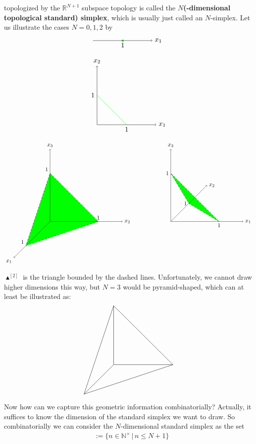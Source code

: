 topologized by the $\mathbb{R}^{N+1}$ subspace topology is called the \textbf{$N$(-dimensional topological standard) simplex}, which is usually just called an $N$-simplex.
Let us illustrate the cases $N = 0,1,2$ by
\[
\begin{tikzpicture}[scale=0.75]
  \fill[fill=green]
    (2,0) node[below] {$1$}
    circle
    (2pt);
  \draw[->]
    (0,0)
    --
    (4,0) node[right] {$x_{1}$};
\end{tikzpicture}
\]
\[
\begin{tikzpicture}[scale=0.75]
  \fill
    (2,0) node[below] {$1$}
    --
    (0,2) node[left] {$1$};
  \draw[green]
    (2,0)
    --
    (0,2);
  \draw[->]
    (0,0)
    --
    (4,0) node[right] {$x_{1}$};
  \draw[->]
    (0,0)
    --
    (0,4) node[above] {$x_{2}$};
\end{tikzpicture}
\]
\[
\begin{tikzpicture}[scale=0.75]
  \filldraw[dashed,fill=green]
    (-7,-2) node[above left] {$1$}
    --
    (-1,0) node[above] {$1$}
    --
    (-5,4) node[above left] {$1$}
    --
    cycle;
  \draw[->]
    (-5,0)
    --
    (-8,-3) node[below left] {$x_{1}$};
  \draw[->]
    (-5,0)
    --
    (1,0) node[right] {$x_{2}$};
  \draw[->]
    (-5,0)
    --
    (-5,6) node[above] {$x_{3}$};
  \filldraw[dashed,fill=green]
    (9,0) node[below] {$1$}
    --
    (6.5,1.5) node[left] {$1$}
    --
    (5,4) node[left] {$1$}
    --
    cycle;
  \draw[->]
    (5,0)
    --
    (11,0) node[right] {$x_{1}$};
  \draw[->]
    (5,0)
    --
    (8,3) node[right] {$x_{2}$};
  \draw[->]
    (5,0)
    --
    (5,6) node[above] {$x_{3}$};
\end{tikzpicture}
\]
$\blacktriangle^{[2]}$ is the triangle bounded by the dashed lines.
Unfortunately, we cannot draw higher dimensions this way, but $N = 3$ would be pyramid-shaped, which can at least be illustrated as:
\[
\begin{tikzpicture}[scale=0.75]
  \draw
    (-2,-2) 
    --
    (4,0)
    --
    (0,4)
    --
    cycle;
  \draw
    (0,0)
    --
    (-2,-2);
  \draw
    (0,0)
    --
    (4,0);
  \draw
    (0,0)
    --
    (0,4);
\end{tikzpicture}
\]
Now how can we capture this geometric information combinatorially? Actually, it suffices to know the dimension of the standard simplex we want to draw.
So combinatorially we can consider the $N$-dimensional standard simplex as the set
\begin{align*}
  [N]
  &:=
  \lbrace
      n
      \in
      \mathbb{N}^{\times}
    \,
    \vert
    \,
      n
      \leq
      N
      +
      1
  \rbrace
\end{align*}
